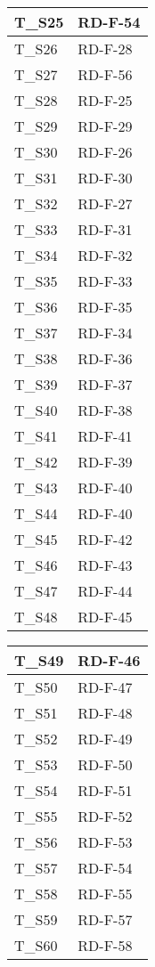 \begin{center}
\begin{tabular}{|m{6em}|m{8em}|}
        \hline
        T\_S25 & RD-F-54\\
        \hline
        T\_S26 & RD-F-28\\
        \hline
        T\_S27 & RD-F-56\\
        \hline
        T\_S28 & RD-F-25\\
        \hline
        T\_S29 & RD-F-29\\
        \hline
        T\_S30 & RD-F-26\\
        \hline
        T\_S31 & RD-F-30\\
        \hline
        T\_S32 & RD-F-27\\
        \hline
        T\_S33 & RD-F-31\\
        \hline
        T\_S34 & RD-F-32\\
        \hline
        T\_S35 & RD-F-33\\
        \hline
        T\_S36 & RD-F-35\\
        \hline
        T\_S37 & RD-F-34\\
        \hline
        T\_S38 & RD-F-36\\
        \hline
        T\_S39 & RD-F-37\\
        \hline
        T\_S40 & RD-F-38\\
        \hline
        T\_S41 & RD-F-41\\
        \hline
        T\_S42 & RD-F-39\\
        \hline
        T\_S43 & RD-F-40\\
        \hline
        T\_S44 & RD-F-40\\
        \hline
        T\_S45 & RD-F-42\\
        \hline
        T\_S46 & RD-F-43\\
        \hline
        T\_S47 & RD-F-44\\
        \hline
        T\_S48 & RD-F-45\\
        \hline
      \end{tabular}
      \newpage
      \renewcommand{\arraystretch}{1.8}
      \begin{tabular}{|m{6em}|m{8em}|}
          \hline
        T\_S49 & RD-F-46\\
        \hline
        T\_S50 & RD-F-47\\
        \hline
        T\_S51 & RD-F-48\\
        \hline
        T\_S52 & RD-F-49\\
        \hline
        T\_S53 & RD-F-50\\
        \hline
        T\_S54 & RD-F-51\\
        \hline
        T\_S55 & RD-F-52\\
        \hline
        T\_S56 & RD-F-53\\
        \hline
        T\_S57 & RD-F-54\\
        \hline
        T\_S58 & RD-F-55\\
        \hline
        T\_S59 & RD-F-57\\
        \hline
        T\_S60 & RD-F-58\\
        \hline
    \end{tabular}
\end{center}